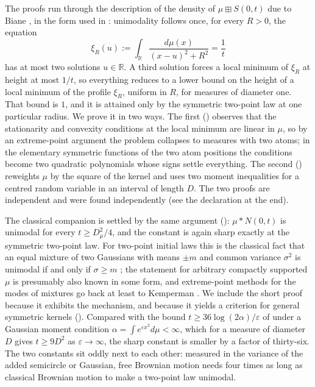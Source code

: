 \documentclass[11pt]{amsart}
\theoremstyle{definition}
\newcommand{\R}{\mathbb{R}}
\newcommand{\bp}{\boxplus}
\begin{document}
The proofs run through the description of the density of $\mu\bp S(0,t)$ due to Biane \cite{Biane97}, in the form used in \cite{HasebeUeda}: unimodality follows once, for every $R>0$, the equation
\begin{equation}\label{eq:levelset}
\xi_R(u):=\int_\R\frac{d\mu(x)}{(x-u)^2+R^2}=\frac1t
\end{equation}
has at most two solutions $u\in\R$. A third solution forces a local minimum of $\xi_R$ at height at most $1/t$, so everything reduces to a lower bound on the height of a local minimum of the profile $\xi_R$, uniform in $R$, for measures of diameter one. That bound is $1$, and it is attained only by the symmetric two-point law at one particular radius. We prove it in two ways. The first () observes that the stationarity and convexity conditions at the local minimum are linear in $\mu$, so by an extreme-point argument the problem collapses to measures with two atoms; in the elementary symmetric functions of the two atom positions the conditions become two quadratic polynomials whose signs settle everything. The second () reweights $\mu$ by the square of the kernel and uses two moment inequalities for a centred random variable in an interval of length $D$. The two proofs are independent and were found independently (see the declaration at the end).

The classical companion is settled by the same argument (): $\mu*N(0,t)$ is unimodal for every $t\ge D_\mu^2/4$, and the constant is again sharp exactly at the symmetric two-point law. For two-point initial laws this is the classical fact that an equal mixture of two Gaussians with means $\pm m$ and common variance $\sigma^2$ is unimodal if and only if $\sigma\ge m$ \cite{Eisenberger, RobertsonFryer, Behboodian}; the statement for arbitrary compactly supported $\mu$ is presumably also known in some form, and extreme-point methods for the modes of mixtures go back at least to Kemperman \cite{Kemperman}. We include the short proof because it exhibits the mechanism, and because it yields a criterion for general symmetric kernels (). Compared with the bound $t\ge 36\log(2\alpha)/\varepsilon$ of \cite[Theorem 1.3]{HasebeUeda} under a Gaussian moment condition $\alpha=\int e^{\varepsilon x^2}d\mu<\infty$, which for a measure of diameter $D$ gives $t\ge 9D^2$ as $\varepsilon\to\infty$, the sharp constant is smaller by a factor of thirty-six. The two constants sit oddly next to each other: measured in the variance of the added semicircle or Gaussian, free Brownian motion needs four times as long as classical Brownian motion to make a two-point law unimodal.
\end{document}
